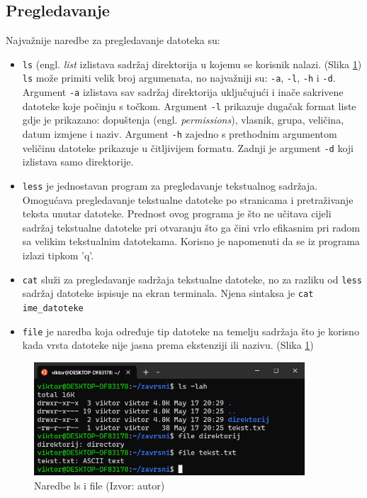 \documentclass{foi}
\begin{document}
\subsection{Pregledavanje}
Najvažnije naredbe za pregledavanje datoteka su:
\begin{itemize}
    \item \verb|ls| (engl. \textit{list} izlistava sadržaj direktorija u kojemu se korisnik nalazi. (Slika \ref{fig:ls}) \verb|ls| može primiti velik broj argumenata, no najvažniji su: \verb|-a|, \verb|-l|, \verb|-h| i \verb|-d|. Argument \verb|-a| izlistava sav sadržaj direktorija uključujući i inače sakrivene datoteke koje počinju s točkom. Argument \verb|-l| prikazuje dugačak format liste gdje je prikazano: dopuštenja (engl. \textit{permissions}), vlasnik, grupa, veličina, datum izmjene i naziv. Argument \verb|-h| zajedno s prethodnim argumentom veličinu datoteke prikazuje u čitljivijem formatu. Zadnji je argument \verb|-d| koji izlistava samo direktorije.
    \item \verb|less| je jednostavan program za pregledavanje tekstualnog sadržaja. Omogućava pregledavanje tekstualne datoteke po stranicama i pretraživanje teksta unutar datoteke. Prednost ovog programa je što ne učitava cijeli sadržaj tekstualne datoteke pri otvaranju što ga čini vrlo efikasnim pri radom sa velikim tekstualnim datotekama. Korisno je napomenuti da se iz programa izlazi tipkom 'q'.
    \item \verb|cat| služi za pregledavanje sadržaja tekstualne datoteke, no za razliku od \verb|less| sadržaj datoteke ispisuje na ekran terminala. Njena sintaksa je \verb|cat ime_datoteke|
    \item \verb|file| je naredba koja određuje tip datoteke na temelju sadržaja što je korisno kada vrsta datoteke nije jasna prema ekstenziji ili nazivu. (Slika \ref{fig:ls})
\end{itemize}
\begin{figure}[H]
    \centering
    \includegraphics[width=0.9\textwidth]{slike/ls_file.png}
    \caption{Naredbe ls i file (Izvor: autor)}
    \label{fig:ls}
\end{figure}
\end{document}
